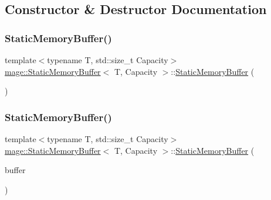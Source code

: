 \subsection{Constructor \& Destructor Documentation}
\mbox{\label{classmage_1_1_static_memory_buffer_a15bf3d201824c9695a36297c40e01a06}} 
\subsubsection{\texorpdfstring{Static\+Memory\+Buffer()}{StaticMemoryBuffer()}\hspace{0.1cm}{\footnotesize\ttfamily [1/3]}}
{\footnotesize\ttfamily template$<$typename T, std\+::size\+\_\+t Capacity$>$ \\
\mbox{\hyperlink{classmage_1_1_static_memory_buffer}{mage\+::\+Static\+Memory\+Buffer}}$<$ T, Capacity $>$\+::\mbox{\hyperlink{classmage_1_1_static_memory_buffer}{Static\+Memory\+Buffer}} (\begin{DoxyParamCaption}{ }\end{DoxyParamCaption})}

\mbox{\label{classmage_1_1_static_memory_buffer_aba8752d8d72ee864a16b9327df70ae1d}} 
\subsubsection{\texorpdfstring{Static\+Memory\+Buffer()}{StaticMemoryBuffer()}\hspace{0.1cm}{\footnotesize\ttfamily [2/3]}}
{\footnotesize\ttfamily template$<$typename T, std\+::size\+\_\+t Capacity$>$ \\
\mbox{\hyperlink{classmage_1_1_static_memory_buffer}{mage\+::\+Static\+Memory\+Buffer}}$<$ T, Capacity $>$\+::\mbox{\hyperlink{classmage_1_1_static_memory_buffer}{Static\+Memory\+Buffer}} (\begin{DoxyParamCaption}\item[{const \mbox{\hyperlink{classmage_1_1_static_memory_buffer}{Static\+Memory\+Buffer}}$<$ T, Capacity $>$ \&}]{buffer }\end{DoxyParamCaption})\hspace{0.3cm}{\ttfamily [default]}}

